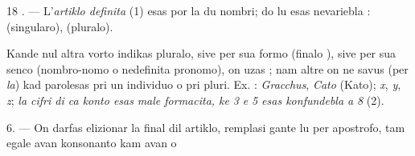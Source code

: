 \begin{VUpage}[22]{18}
. --- L'\textit{artiklo definita} (1) esas  por la du nombri; do\nl
lu esas nevariebla :  (singularo),  (pluralo).

Kande nul altra vorto indikas pluralo, sive per sua formo\nl
(finalo ), sive per sua senco (nombro-nomo o nedefinita\nl
pronomo), on uzas ; nam altre on ne savus (per \textit{la}) kad\nl
parolesas pri un individuo o pri pluri. Ex. :  \textit{Gracchus},\nl
{} \textit{Cato} (Kato);  \textit{x},  \textit{y},  \textit{z}; \textit{la cifri di ca konto esas }\nl
\textit{male formacita, ke}  \textit{3 e}  \textit{5 esas konfundebla a}  \textit{8} (2).

6. --- On darfas elizionar la  final dil artiklo, remplasi\cc
gante lu per apostrofo, tam egale avan konsonanto kam avan\nl
\nl
{} o 
\end{VUpage}

